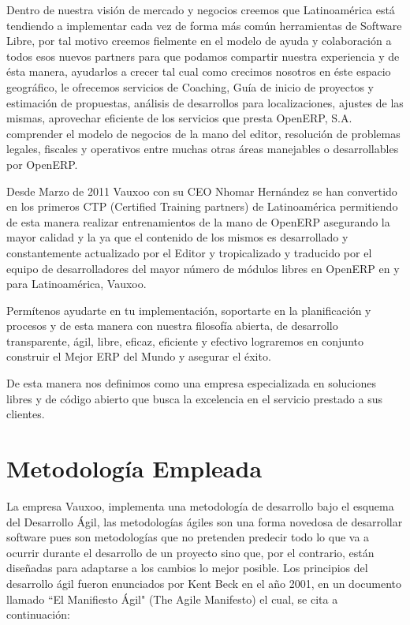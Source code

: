 \documentclass[a4paper, 12pt]{article}
\begin{document}
Dentro de nuestra visión de mercado y negocios creemos que Latinoamérica está tendiendo a implementar cada vez de forma más común herramientas de Software Libre, por tal motivo creemos fielmente en el modelo de ayuda y colaboración a todos esos nuevos partners para que podamos compartir nuestra experiencia y de ésta manera, ayudarlos a crecer tal cual como crecimos nosotros en éste espacio geográfico, le ofrecemos servicios de Coaching, Guía de inicio de proyectos y estimación de propuestas, análisis de desarrollos para localizaciones, ajustes de las mismas, aprovechar eficiente de los servicios que presta OpenERP, S.A. comprender el modelo de negocios de la mano del editor, resolución de problemas legales, fiscales y operativos entre muchas otras áreas manejables o desarrollables por OpenERP.

Desde Marzo de 2011 Vauxoo con su CEO Nhomar Hernández se han convertido en los primeros CTP (Certified Training partners) de Latinoamérica permitiendo de esta manera realizar entrenamientos de la mano de OpenERP asegurando la mayor calidad y la ya que el contenido de los mismos es desarrollado y constantemente actualizado por el Editor y tropicalizado y traducido por el equipo de desarrolladores del mayor número de módulos libres en OpenERP en y para Latinoamérica, Vauxoo.

Permítenos ayudarte en tu implementación, soportarte en la planificación y procesos y de esta manera con nuestra filosofía abierta, de desarrollo transparente, ágil, libre, eficaz, eficiente y efectivo lograremos en conjunto construir el Mejor ERP del Mundo y asegurar el éxito.

De esta manera nos definimos como una empresa especializada en soluciones libres y de código abierto que busca la excelencia en el servicio prestado a sus clientes.

\newpage

\section{Metodología Empleada}
La empresa Vauxoo, implementa una metodología de desarrollo bajo el esquema del Desarrollo Ágil, las metodologías ágiles son una forma novedosa de desarrollar software pues son metodologías que no pretenden predecir todo lo que va a ocurrir durante el desarrollo de un proyecto sino que, por el contrario, están diseñadas para adaptarse a los cambios lo mejor posible. Los principios del desarrollo ágil fueron enunciados por Kent Beck en el año 2001, en un documento llamado ``El Manifiesto Ágil" (The Agile Manifesto) el cual, se cita a continuación:
\end{document}
